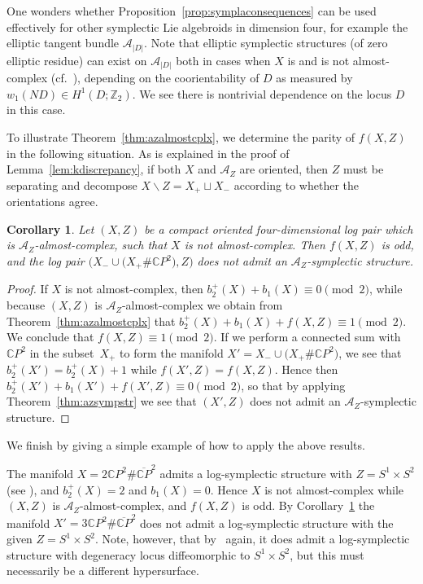 \documentclass[pdftex]{sigma}
\numberwithin{equation}{section}
\newtheorem{Corollary}[Theorem]{Corollary}
\begin{document}
\begin{Remark} One wonders whether Proposition~\ref{prop:symplaconsequences} can be used effectively for other symplectic Lie algebroids in dimension four, for example the elliptic tangent bundle $\mathcal{A}_{|D|}$. Note that elliptic symplectic structures (of zero elliptic residue) can exist on $\mathcal{A}_{|D|}$ both in cases when $X$ is and is not almost-complex (cf.\ \cite{BehrensCavalcantiKlaasse18}), depending on the coorientability of $D$ as measured by $w_1(ND) \in H^1(D;\mathbb{Z}_2)$. We see there is nontrivial dependence on the locus $D$ in this case.
\end{Remark}

To illustrate Theorem~\ref{thm:azalmostcplx}, we determine the parity of $f(X,Z)$ in the following situation. As is explained in the proof of Lemma~\ref{lem:kdiscrepancy}, if both $X$ and $\mathcal{A}_Z$ are oriented, then $Z$ must be separating and decompose $X\backslash Z = X_+ \sqcup X_-$ according to whether the orientations agree.

\begin{Corollary}\label{cor:aznosympconn} Let $(X,Z)$ be a compact oriented four-dimensional log pair which is $\mathcal{A}_Z$-almost-complex, such that $X$ is not almost-complex. Then $f(X,Z)$ is odd, and the log pair $\big(X_- \cup \big(X_+ \# \mathbb{C} P^2\big), Z\big)$ does not admit an $\mathcal{A}_Z$-symplectic structure.
\end{Corollary}

\begin{proof} If $X$ is not almost-complex, then $b_2^+(X) + b_1(X) \equiv 0 \pmod 2$, while because $(X,Z)$ is $\mathcal{A}_Z$-almost-complex we obtain from Theorem~\ref{thm:azalmostcplx} that $b_2^+(X) + b_1(X) + f(X,Z) \equiv 1 \pmod 2$. We conclude that $f(X,Z) \equiv 1 \pmod 2$. If we perform a connected sum with $\mathbb{C} P^2$ in the subset~$X_+$ to form the manifold $X' = X_- \cup \big(X_+ \# \mathbb{C} P^2\big)$, we see that $b_2^+(X') = b_2^+(X) + 1$ while $f(X',Z) = f(X,Z)$. Hence then $b_2^+(X') + b_1(X') + f(X',Z) \equiv 0 \pmod 2$, so that by applying Theorem~\ref{thm:azsympstr} we see that $(X',Z)$ does not admit an $\mathcal{A}_Z$-symplectic structure.
\end{proof}

We finish by giving a simple example of how to apply the above results.

\begin{Example} The manifold $X = 2 \mathbb{C} P^2 \# \overline{\mathbb{C} P}^2$ admits a log-symplectic structure with $Z = S^1 \times S^2$ (see \cite{Cavalcanti17}), and $b_2^+(X) = 2$ and $b_1(X) = 0$. Hence $X$ is not almost-complex while $(X,Z)$ is $\mathcal{A}_Z$-almost-complex, and $f(X,Z)$ is odd. By Corollary~\ref{cor:aznosympconn} the manifold $X' = 3 \mathbb{C} P^2 \# \overline{\mathbb{C} P}^2$ does not admit a log-symplectic structure with the given $Z = S^1 \times S^2$. Note, however, that by~\cite{Cavalcanti17} again, it does admit a log-symplectic structure with degeneracy locus diffeomorphic to $S^1 \times S^2$, but this must necessarily be a different hypersurface.
\end{Example}
\end{document}
